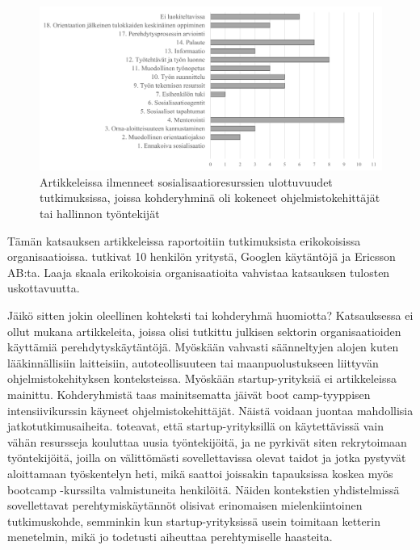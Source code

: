 \documentclass[utf8]{gradu3}
\begin{document}
\begin{figure}[h]
    \centering
    \includegraphics[width=\textwidth]{media/ulottuvuudet_kohderyhmat_kokeneet_tai_hallinto.png}
    \caption{Artikkeleissa ilmenneet sosialisaatioresurssien ulottuvuudet tutkimuksissa, joissa kohderyhminä oli kokeneet ohjelmistokehittäjät tai hallinnon työntekijät}
    \label{kuvio:ulottuvuudet_kohderyhmat_kokeneet_tai_hallinto}
\end{figure}

Tämän katsauksen artikkeleissa raportoitiin tutkimuksista erikokoisissa organisaatioissa. \textcite{viana-ym-2014} tutkivat 10 henkilön yritystä, \textcite{johnson-senges-2010} Googlen käytäntöjä ja \textcite{britto-ym-2020} Ericsson AB:ta. Laaja skaala erikokoisia organisaatioita vahvistaa katsauksen tulosten uskottavuutta.

Jäikö sitten jokin oleellinen kohteksti tai kohderyhmä huomiotta? Katsauksessa ei ollut mukana artikkeleita, joissa olisi tutkittu julkisen sektorin organisaatioiden käyttämiä perehdytyskäytäntöjä. Myöskään vahvasti säänneltyjen alojen kuten lääkinnällisiin laitteisiin, autoteollisuuteen tai maanpuolustukseen liittyvän ohjelmistokehityksen konteksteissa. Myöskään startup-yrityksiä ei artikkeleissa mainittu. Kohderyhmistä taas mainitsematta jäivät boot camp-tyyppisen intensiivikurssin käyneet ohjelmistokehittäjät. Näistä voidaan juontaa mahdollisia jatkotutkimusaiheita. \textcite{lyon-green-2021} toteavat, että startup-yrityksillä on käytettävissä vain vähän resursseja kouluttaa uusia työntekijöitä,  ja ne pyrkivät siten rekrytoimaan työntekijöitä, joilla on välittömästi sovellettavissa olevat taidot ja jotka pystyvät aloittamaan työskentelyn heti, mikä saattoi joissakin tapauksissa koskea myös bootcamp -kurssilta valmistuneita henkilöitä. Näiden kontekstien yhdistelmissä sovellettavat perehtymiskäytännöt olisivat erinomaisen mielenkiintoinen tutkimuskohde, semminkin kun startup-yrityksissä usein toimitaan ketterin menetelmin, mikä jo todetusti aiheuttaa perehtymiselle haasteita.
\end{document}
